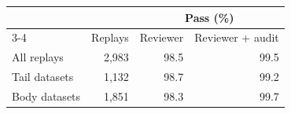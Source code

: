 \begin{tabular}{@{}lrrr@{}}
\toprule
& & \multicolumn{2}{c}{Pass (\%)} \\
\cmidrule(l){3-4}
 & Replays & Reviewer & Reviewer + audit \\
\midrule
All replays & 2,983 & 98.5 & 99.5 \\
Tail datasets & 1,132 & 98.7 & 99.2 \\
Body datasets & 1,851 & 98.3 & 99.7 \\
\bottomrule
\end{tabular}
